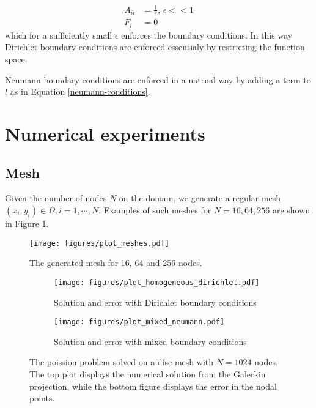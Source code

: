 \documentclass[11pt,a4paper,english]{elsarticle}%
\begin{document}
\begin{equation*}
    \begin{aligned}
    A_{ii} &= \frac{1}{\epsilon}, \, \epsilon << 1 \\
    F_i &= 0
    \end{aligned}
\end{equation*}
which for a sufficiently small $\epsilon$ enforces the boundary conditions. In this way Dirichlet boundary conditions are enforced essentialy by restricting the function space. 

Neumann boundary conditions are enforced in a natrual way by adding a term to $l$ as in Equation \eqref{neumann-conditions}.

\section{Numerical experiments}
\subsection{Mesh}
Given the number of nodes $N$ on the domain, we generate a regular mesh $(x_i,y_i) \in \Omega, i = 1,\cdots,N$.
Examples of such  meshes for $N = 16,64,256$ are shown in Figure \ref{plot-meshes}.


\begin{figure}[b]
    \centering
        \texttt{[image: figures/plot\_meshes.pdf]}
    \caption{The generated mesh for  16, 64 and 256 nodes. }
    \label{plot-meshes}
\end{figure}

\begin{figure}[ht]
    \begin{subfigure}[b]{0.5\textwidth}
        \centering
            \texttt{[image: figures/plot\_homogeneous\_dirichlet.pdf]}
            \caption{Solution and error with Dirichlet boundary conditions}
        \label{solution-error-dirichlet}
    \end{subfigure}\qquad
    \begin{subfigure}[b]{0.5\textwidth}
        \centering
            \texttt{[image: figures/plot\_mixed\_neumann.pdf]}
            \caption{Solution and error with mixed boundary conditions}
        \label{solution-error-mixed}
    \end{subfigure}
    \label{fig-convergence}
    \caption{The poission problem solved on a disc mesh with $N = 1024$ nodes.
    The top plot displays the numerical solution from the Galerkin projection,
    while the bottom figure displays the error in the nodal points.}
\end{figure}
\end{document}
